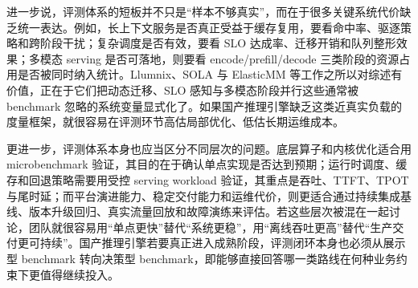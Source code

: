 进一步说，评测体系的短板并不只是“样本不够真实”，而在于很多关键系统代价缺乏统一表达。例如，长上下文服务是否真正受益于缓存复用，要看命中率、驱逐策略和跨阶段干扰；复杂调度是否有效，要看 SLO 达成率、迁移开销和队列整形效果；多模态 serving 是否可落地，则要看 encode/prefill/decode 三类阶段的资源占用是否被同时纳入统计。Llumnix、SOLA 与 ElasticMM 等工作之所以对综述有价值，正在于它们把动态迁移、SLO 感知与多模态阶段并行这些通常被 benchmark 忽略的系统变量显式化了\citep{sun2024llumnix,hong2025sola,liu2025elasticmm}。如果国产推理引擎缺乏这类近真实负载的度量框架，就很容易在评测环节高估局部优化、低估长期运维成本。

更进一步，评测体系本身也应当区分不同层次的问题。底层算子和内核优化适合用 microbenchmark 验证，其目的在于确认单点实现是否达到预期；运行时调度、缓存和回退策略需要用受控 serving workload 验证，其重点是吞吐、TTFT、TPOT 与尾时延；而平台演进能力、稳定交付能力和运维代价，则更适合通过持续集成基线、版本升级回归、真实流量回放和故障演练来评估。若这些层次被混在一起讨论，团队就很容易用“单点更快”替代“系统更稳”，用“离线吞吐更高”替代“生产交付更可持续”。国产推理引擎若要真正进入成熟阶段，评测闭环本身也必须从展示型 benchmark 转向决策型 benchmark，即能够直接回答哪一类路线在何种业务约束下更值得继续投入。

